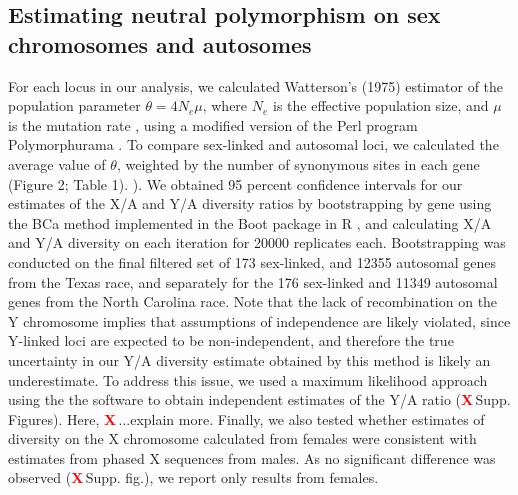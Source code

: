 \documentclass[9pt,twocolumn,twoside]{gsajnl}
\newcommand{\X}{\textcolor{red}{\bf X\,}}
\begin{document}
\subsection*{Estimating neutral polymorphism on sex chromosomes and autosomes}
For each locus in our analysis, we calculated Watterson’s (1975) estimator of the population parameter $\theta=4N_{e}\mu$, where $N_{e}$ is the effective population size, and $\mu$ is the mutation rate \citep{watterson1975}, using a modified version of the Perl program Polymorphurama \citep{bachtrog2006}. To compare sex-linked and autosomal loci, we calculated the average value of $\theta$, weighted by the number of synonymous sites in each gene (Figure 2; Table 1). ). We obtained 95 percent confidence intervals for our estimates of the X/A and Y/A diversity ratios by bootstrapping by gene using the BCa method \citep{efron1994} implemented in the Boot package in R \citep{canty2012boot}, and calculating X/A and Y/A diversity on each iteration for 20000 replicates each. Bootstrapping was conducted on the final filtered set of 173 sex-linked, and 12355 autosomal genes from the Texas race, and separately for the 176 sex-linked and 11349 autosomal genes from the North Carolina race. Note that the lack of recombination on the Y chromosome implies that assumptions of independence are likely violated, since Y-linked loci are expected to be non-independent, and therefore the true uncertainty in our Y/A diversity estimate obtained by this method is likely an underestimate. To address this issue, we used a maximum likelihood approach using the the software \citep{wright2004hka} to obtain independent estimates of the Y/A ratio (\X Supp. Figures). Here, \X{...explain more}. Finally, we also tested whether estimates of diversity on the X chromosome calculated from females were consistent with estimates from phased X sequences from males. As no significant difference was observed (\X Supp. fig.), we report only results from females.
\end{document}
